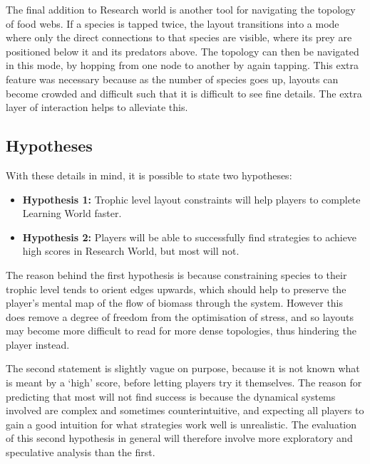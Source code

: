 The final addition to Research world is another tool for navigating the topology of food webs. If a species is tapped twice, the layout transitions into a mode where only the direct connections to that species are visible, where its prey are positioned below it and its predators above. The topology can then be navigated in this mode, by hopping from one node to another by again tapping.
This extra feature was necessary because as the number of species goes up, layouts can become crowded and difficult such that it is difficult to see fine details. The extra layer of interaction helps to alleviate this.

\subsection{Hypotheses}
With these details in mind, it is possible to state two hypotheses:
\begin{mdframed}[backgroundcolor=WhiteSmoke]
  \begin{itemize}[leftmargin=*]
    \item \textbf{Hypothesis 1:} Trophic level layout constraints will help players to complete Learning World faster.
    \item \textbf{Hypothesis 2:} Players will be able to successfully find strategies to achieve high scores in Research World, but most will not.
    \end{itemize}
\end{mdframed}
The reason behind the first hypothesis is because constraining species to their trophic level tends to orient edges upwards, which should help to preserve the player's mental map of the flow of biomass through the system. However this does remove a degree of freedom from the optimisation of stress, and so layouts may become more difficult to read for more dense topologies, thus hindering the player instead.

The second statement is slightly vague on purpose, because it is not known what is meant by a `high' score, before letting players try it themselves.
The reason for predicting that most will not find success is because the dynamical systems involved are complex and sometimes counterintuitive, and expecting all players to gain a good intuition for what strategies work well is unrealistic.
The evaluation of this second hypothesis in general will therefore involve more exploratory and speculative analysis than the first.

